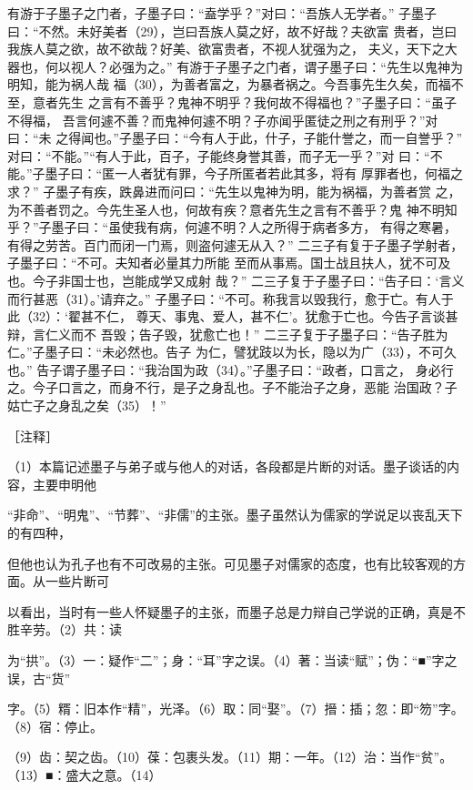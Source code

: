 \documentclass[12pt,UTF8]{ctexbook}
\begin{document}
有游于子墨子之门者，子墨子曰：“盍学乎？”对曰：“吾族人无学者。” 
子墨子曰：“不然。未好美者（29），岂曰吾族人莫之好，故不好哉？夫欲富 
贵者，岂曰我族人莫之欲，故不欲哉？好美、欲富贵者，不视人犹强为之， 
夫义，天下之大器也，何以视人？必强为之。” 
有游于子墨子之门者，谓子墨子曰：“先生以鬼神为明知，能为祸人哉 
福（30），为善者富之，为暴者祸之。今吾事先生久矣，而福不至，意者先生 
之言有不善乎？鬼神不明乎？我何故不得福也？”子墨子曰：“虽子不得福， 
吾言何遽不善？而鬼神何遽不明？子亦闻乎匿徒之刑之有刑乎？”对曰：“未 
之得闻也。”子墨子曰：“今有人于此，什子，子能什誉之，而一自誉乎？” 
对曰：“不能。”“有人于此，百子，子能终身誉其善，而子无一乎？”对 
曰：“不能。”子墨子曰：“匿一人者犹有罪，今子所匿者若此其多，将有 
厚罪者也，何福之求？” 
子墨子有疾，跌鼻进而问曰：“先生以鬼神为明，能为祸福，为善者赏 
之，为不善者罚之。今先生圣人也，何故有疾？意者先生之言有不善乎？鬼 
神不明知乎？”子墨子曰：“虽使我有病，何遽不明？人之所得于病者多方， 
有得之寒暑，有得之劳苦。百门而闭一门焉，则盗何遽无从入？” 
二三子有复于子墨子学射者，子墨子曰：“不可。夫知者必量其力所能 
至而从事焉。国士战且扶人，犹不可及也。今子非国士也，岂能成学又成射 
哉？” 
二三子复于子墨子曰：“告子曰：‘言义而行甚恶（31）。’请弃之。” 
子墨子曰：“不可。称我言以毁我行，愈于亡。有人于此（32）：‘翟甚不仁， 
尊天、事鬼、爱人，甚不仁’。犹愈于亡也。今告子言谈甚辩，言仁义而不 
吾毁；告子毁，犹愈亡也！” 
二三子复于子墨子曰：“告子胜为仁。”子墨子曰：“未必然也。告子 
为仁，譬犹跂以为长，隐以为广（33），不可久也。” 
告子谓子墨子曰：“我治国为政（34）。”子墨子曰：“政者，口言之， 
身必行之。今子口言之，而身不行，是子之身乱也。子不能治子之身，恶能 
治国政？子姑亡子之身乱之矣（35）！” 


［注释］ 

（1）本篇记述墨子与弟子或与他人的对话，各段都是片断的对话。墨子谈话的内容，主要申明他 

“非命”、“明鬼”、“节葬”、“非儒”的主张。墨子虽然认为儒家的学说足以丧乱天下的有四种， 

但他也认为孔子也有不可改易的主张。可见墨子对儒家的态度，也有比较客观的方面。从一些片断可 

以看出，当时有一些人怀疑墨子的主张，而墨子总是力辩自己学说的正确，真是不胜辛劳。（2）共：读 

为“拱”。（3）一：疑作“二”；身：“耳”字之误。（4）著：当读“赋”；伪：“■”字之误，古“货” 

字。（5）糈：旧本作“精”，光泽。（6）取：同“娶”。（7）搢：插；忽：即“笏”字。（8）宿：停止。 

（9）齿：契之齿。（10）葆：包裹头发。（11）期：一年。（12）治：当作“贫”。（13）■：盛大之意。（14） 
\end{document}
